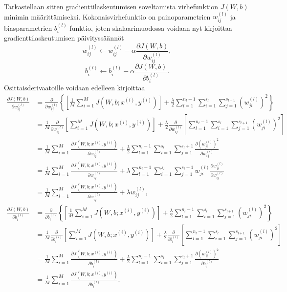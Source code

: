 \documentclass[12pt,a4paper,finnish,oneside,titlepage]{article}
\theoremstyle{plain}
\theoremstyle{definition}
\theoremstyle{remark}
\begin{document}
Tarkastellaan sitten gradienttilaskeutumisen soveltamista virhefunktion \(J(W, b)\) minimin määrittämiseksi. Kokonaisvirhefunktio on painoparametrien \(w_{ij}^{(l)}\) ja biasparametrien \(b_i^{(l)}\) funktio, joten skalaarimuodossa voidaan nyt kirjoittaa gradienttilaskeutumisen päivityssäännöt \begin{equation} \label{Wpaiv} w_{ij}^{(l)}\leftarrow w_{ij}^{(l)}-\alpha \frac{\partial J(W, b)}{\partial w_{ij}^{(l)}},\end{equation}
\begin{equation} \label{bpaiv} b_i^{(l)}\leftarrow b_i^{(l)}-\alpha \frac{\partial J(W, b)}{\partial b_i^{(l)}}.\end{equation}
Osittaisderivaatoille voidaan edelleen kirjoittaa \[\begin{align*}
    \frac{\partial J(W, b)}{\partial w_{ij}^{(l)}}&=\frac{\partial}{\partial w_{ij}^{(l)}} \left\{\left[\frac{1}{M}\sum_{i=1}^{M} J(W, b; x^{(i)}, y^{(i)})\right]+\frac{\lambda}{2}\sum_{l=1}^{n_l-1}\sum_{i=1}^{s_l}\sum_{j=1}^{s_{l+1}} \left(w_{ji}^{(l)}\right)^2\right\}\\
    &=\frac{1}{M}\frac{\partial}{\partial w_{ij}^{(l)}} \left[\sum_{i=1}^{M} J(W, b; x^{(i)}, y^{(i)})\right]+\frac{\lambda}{2}\frac{\partial}{\partial w_{ij}^{(l)}} \left[\sum_{l=1}^{n_l-1}\sum_{i=1}^{s_l}\sum_{j=1}^{s_{l+1}} \left(w_{ji}^{(l)}\right)^2\right]\\
    &=\frac{1}{M} \sum_{i=1}^{M} \frac{\partial J(W, b; x^{(i)}, y^{(i)})}{\partial w_{ij}^{(l)}}+\frac{\lambda}{2} \sum_{l=1}^{n_l-1} \sum_{i=1}^{s_l} \sum_{j=1}^{s_l+1} \frac{\partial (w_{ji}^{(l)})^2}{\partial w_{ij}^{(l)}}\\
    &=\frac{1}{M} \sum_{i=1}^{M} \frac{\partial J(W, b; x^{(i)}, y^{(i)})}{\partial w_{ij}^{(l)}}+\lambda \sum_{l=1}^{n_l-1} \sum_{i=1}^{s_l} \sum_{j=1}^{s_l+1} w_{ji}^{(l)}\frac{\partial w_{ji}^{(l)}}{\partial w_{ij}^{(l)}}\\
    &=\frac{1}{M} \sum_{i=1}^{M} \frac{\partial J(W, b; x^{(i)}, y^{(i)})}{\partial w_{ij}^{(l)}}+\lambda w_{ij}^{(l)},
\end{align*}\]
\[\begin{align*}
    \frac{\partial J(W, b)}{\partial b_{i}^{(l)}}&=\frac{\partial}{\partial b_{i}^{(l)}} \left\{\left[\frac{1}{M}\sum_{i=1}^{M} J(W, b; x^{(i)}, y^{(i)})\right]+\frac{\lambda}{2}\sum_{l=1}^{n_l-1}\sum_{i=1}^{s_l}\sum_{j=1}^{s_{l+1}} \left(w_{ji}^{(l)}\right)^2\right\}\\
    &=\frac{1}{M}\frac{\partial}{\partial b_{i}^{(l)}} \left[\sum_{i=1}^{M} J(W, b; x^{(i)}, y^{(i)})\right]+\frac{\lambda}{2}\frac{\partial}{\partial b_{i}^{(l)}} \left[\sum_{l=1}^{n_l-1}\sum_{i=1}^{s_l}\sum_{j=1}^{s_{l+1}} \left(w_{ji}^{(l)}\right)^2\right]\\
    &=\frac{1}{M} \sum_{i=1}^{M} \frac{\partial J(W, b; x^{(i)}, y^{(i)})}{\partial b_{i}^{(l)}}+\frac{\lambda}{2} \sum_{l=1}^{n_l-1} \sum_{i=1}^{s_l} \sum_{j=1}^{s_l+1} \frac{\partial (w_{ji}^{(l)})^2}{\partial b_{i}^{(l)}}\\
    &=\frac{1}{M} \sum_{i=1}^{M} \frac{\partial J(W, b; x^{(i)}, y^{(i)})}{\partial b_{i}^{(l)}}.
\end{align*}\]
\end{document}
